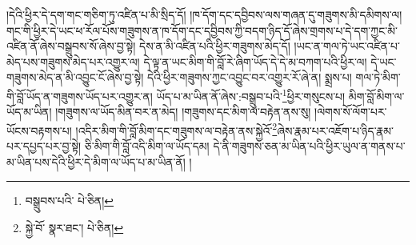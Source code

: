 །དེའི་ཕྱིར་དེ་དག་གང་གཅིག་ཏུ་འཛིན་པ་མི་སྲིད་དོ། །ཁ་དོག་དང་དབྱིབས་ལས་གཞན་དུ་གཟུགས་མི་དམིགས་ལ། གང་གི་ཕྱིར་དེ་ཡང་ཕ་རོལ་པོས་གཟུགས་ན་ཁ་དོག་དང་དབྱིབས་ཀྱི་བདག་ཉིད་དོ་ཞེས་གྲགས་པ་དེ་དག་ཀྱང་མི་འཛིན་ནོ་ཞེས་བསྒྲུབས་སོ་ཞེས་བྱ་སྟེ། དེས་ན་མི་འཛིན་པའི་ཕྱིར་གཟུགས་མེད་དོ། །ཡང་ན་གལ་ཏེ་ཡང་འཛིན་པ་མེད་པས་གཟུགས་མེད་པར་འགྱུར་ལ། དེ་ལྟ་ན་ཡང་མིག་གི་བློ་རེ་ཞིག་ཡོད་དེ་དེ་མ་བཀག་པའི་ཕྱིར་ལ། དེ་ཡང་གཟུགས་མེད་ན་མི་འབྱུང་ངོ་ཞེས་བྱ་སྟེ། དེའི་ཕྱིར་གཟུགས་ཀྱང་འབྱུང་བར་འགྱུར་རོ་ཞེ་ན། སྨྲས་པ། གལ་ཏེ་མིག་གི་བློ་ཡོད་ན་གཟུགས་ཡོད་པར་འགྱུར་ན། ཡོད་པ་མ་ཡིན་ནོ་ཞེས་:བསྒྲུབ་པའི་\footnote{བསྒྲུབས་པའི་  པེ་ཅིན། }ཕྱིར་གསུངས་པ། མིག་བློ་མིག་ལ་ཡོད་མ་ཡིན། །གཟུགས་ལ་ཡོད་མིན་བར་ན་མེད། །གཟུགས་དང་མིག་ལ་བརྟེན་ནས་སུ། །ལེགས་སོ་ལོག་པར་ཡོངས་བརྟགས་པ། །འདིར་མིག་གི་བློ་མིག་དང་གཟུགས་ལ་བརྟེན་ནས་སྐྱེའོ་\footnote{སྐྱེ་བོ་  སྣར་ཐང་།  པེ་ཅིན། }ཞེས་རྣམ་པར་འཇོག་པ་ཉིད་རྣམ་པར་དཔྱད་པར་བྱ་སྟེ། ཅི་མིག་གི་བློ་འདི་མིག་ལ་ཡོད་དམ། དེ་ནི་གཟུགས་ཅན་མ་ཡིན་པའི་ཕྱིར་ཡུལ་ན་གནས་པ་མ་ཡིན་པས་དེའི་ཕྱིར་དེ་མིག་ལ་ཡོད་པ་མ་ཡིན་ནོ། །

